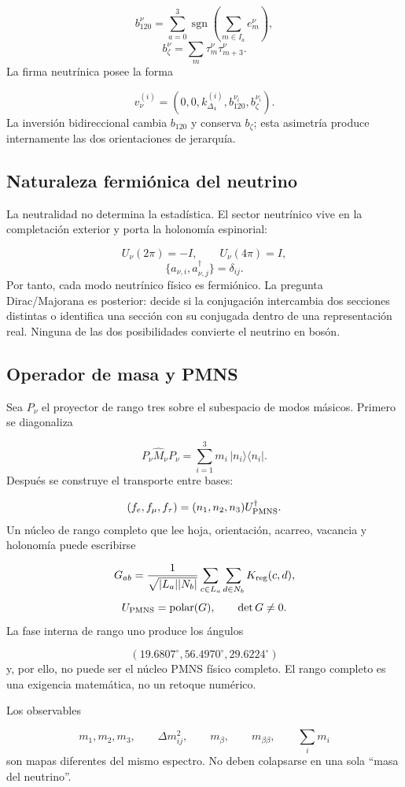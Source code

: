 \[
 b_{120}^\nu
 =\sum_{a=0}^{3}
 \operatorname{sgn}\!\left(\sum_{m\in I_a}e_m^\nu\right),
\]
\[
 b_\zeta^\nu=\sum_m\tau_m^\nu\tau_{m+3}^\nu.
\]
La firma neutrínica posee la forma

\[
 v_\nu^{(i)}
 =(0,0,k_{\Delta_4}^{(i)},b_{120}^{\nu_i},b_\zeta^{\nu_i}).
\]
La inversión bidireccional cambia \(b_{120}\) y conserva \(b_\zeta\); esta asimetría produce internamente las dos orientaciones de jerarquía.

\subsection{Naturaleza fermiónica del neutrino}
La neutralidad no determina la estadística. El sector neutrínico vive en la completación exterior y porta la holonomía espinorial:

\[
 U_\nu(2\pi)=-I,\qquad U_\nu(4\pi)=I,
\]
\[
 \{a_{\nu,i},a_{\nu,j}^\dagger\}=\delta_{ij}.
\]
Por tanto, cada modo neutrínico físico es fermiónico. La pregunta Dirac/Majorana es posterior: decide si la conjugación intercambia dos secciones distintas o identifica una sección con su conjugada dentro de una representación real. Ninguna de las dos posibilidades convierte el neutrino en bosón.

\subsection{Operador de masa y PMNS}
Sea \(P_\nu\) el proyector de rango tres sobre el subespacio de modos másicos. Primero se diagonaliza

\[
 P_\nu\widehat M_\nu P_\nu
 =\sum_{i=1}^{3}m_i\,|n_i\rangle\langle n_i|.
\]
Después se construye el transporte entre bases:

\[
 (f_e,f_\mu,f_\tau)
 =(n_1,n_2,n_3)U_{\rm PMNS}^\dagger.
\]
Un núcleo de rango completo que lee hoja, orientación, acarreo, vacancia y holonomía puede escribirse

\[
 G_{ab}=
 \frac1{\sqrt{|L_a||N_b|}}
 \sum_{c\in L_a}\sum_{d\in N_b}K_{\rm reg}(c,d),
\]
\[
 U_{\rm PMNS}=\operatorname{polar}(G),
\qquad \det G\ne0.
\]
La fase interna de rango uno produce los ángulos

\[
 (19.6807^\circ,56.4970^\circ,29.6224^\circ)
\]
y, por ello, no puede ser el núcleo PMNS físico completo. El rango completo es una exigencia matemática, no un retoque numérico.

Los observables

\[
 m_1,m_2,m_3,\qquad
 \Delta m_{ij}^2,\qquad
 m_\beta,\qquad
 m_{\beta\beta},\qquad
 \sum_i m_i
\]
son mapas diferentes del mismo espectro. No deben colapsarse en una sola “masa del neutrino”.

